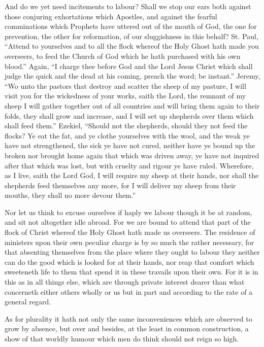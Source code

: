 And do we yet need incitements to labour? Shall we stop our ears both against those conjuring exhortations which Apostles, and against the fearful comminations which Prophets have uttered out of the mouth of God, the one for prevention, the other for reformation, of our sluggishness in this behalf? St. Paul, “Attend to yourselves and to all the flock whereof the Holy Ghost hath made you overseers, to feed the Church of God which he hath purchased with his own blood.” Again, “I charge thee before God and the Lord Jesus Christ which shall judge the quick and the dead at his coming, preach the word; be instant.” Jeremy, “Wo unto the pastors that destroy and scatter the sheep of my pasture, I will visit you for the wickedness of your works, saith the Lord, the remnant of my sheep I will gather together out of all countries and will bring them again to their folds, they shall grow and increase, and I will set up shepherds over them which shall feed them.” Ezekiel, “Should not the shepherds, should they not feed the flocks? Ye eat the fat, and ye clothe yourselves with the wool, and the weak ye have not strengthened, the sick ye have not cured, neither have ye bound up the broken nor brought home again that which was driven away, ye have not inquired after that which was lost, but with cruelty and rigour ye have ruled. Wherefore, as I live, saith the Lord God, I will require my sheep at their hands, nor shall the shepherds feed themselves any more, for I will deliver my sheep from their mouths, they shall no more devour them.”

Nor let us think to excuse ourselves if haply we labour though it be at random, and sit not altogether idle abroad. For we are bound to attend that part of the flock of Christ whereof the Holy Ghost hath made us overseers. The residence of ministers upon their own peculiar charge is by so much the rather necessary, for that absenting themselves  from the place where they ought to labour they neither can do the good which is looked for at their hands,
 nor reap that comfort which sweeteneth life to them that spend it in these travails upon their own. For it is in this as in all things else, which are through private interest dearer than what concerneth either others wholly or us but in part and according to the rate of a general regard.

As for plurality it hath not only the same inconveniences which are observed to grow by absence, but over and besides, at the least in common construction, a show of that worldly humour which men do think should not reign so high.

